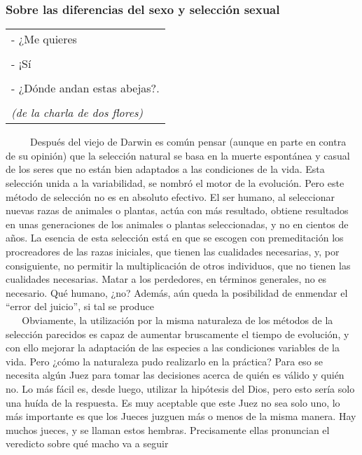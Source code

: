 \protect\hypertarget{M4}{}{}

\subsubsection{Sobre las diferencias del sexo y selección
sexual}\label{sobre-las-diferencias-del-sexo-y-selecciuxf3n-sexual}

\begin{longtable}[]{@{}l@{}}
\toprule
- ¿Me quieres\tabularnewline
\tabularnewline
- ¡Sí\tabularnewline
\tabularnewline
- ¿Dónde andan estas abejas?.\tabularnewline
\tabularnewline
\emph{(de la charla de dos flores)}\tabularnewline
\bottomrule
\end{longtable}

~ ~ ~ Después del viejo de Darwin es común pensar (aunque en parte en
contra de su opinión) que la selección natural se basa en la muerte
espontánea y casual de los seres que no están bien adaptados a las
condiciones de la vida. Esta selección unida a la variabilidad, se
nombró el motor de la evolución. Pero este método de selección no es en
absoluto efectivo. El ser humano, al seleccionar nuevas razas de
animales o plantas, actúa con más resultado, obtiene resultados en unas
generaciones de los animales o plantas seleccionadas, y no en cientos de
años. La esencia de esta selección está en que se escogen con
premeditación los procreadores de las razas iniciales, que tienen las
cualidades necesarias, y, por consiguiente, no permitir la
multiplicación de otros individuos, que no tienen las cualidades
necesarias. Matar a los perdedores, en términos generales, no es
necesario. Qué humano, ¿no? Además, aún queda la posibilidad de enmendar
el ``error del juicio'', si tal se produce\\
\hspace*{0.333em} ~ ~ Obviamente, la utilización por la misma naturaleza
de los métodos de la selección parecidos es capaz de aumentar
bruscamente el tiempo de evolución, y con ello mejorar la adaptación de
las especies a las condiciones variables de la vida. Pero ¿cómo la
naturaleza pudo realizarlo en la práctica? Para eso se necesita algún
Juez para tomar las decisiones acerca de quién es válido y quién no. Lo
más fácil es, desde luego, utilizar la hipótesis del Dios, pero esto
sería solo una huída de la respuesta. Es muy aceptable que este Juez no
sea solo uno, lo más importante es que los Jueces juzguen más o menos de
la misma manera. Hay muchos jueces, y se llaman estos hembras.
Precisamente ellas pronuncian el veredicto sobre qué macho va a seguir
